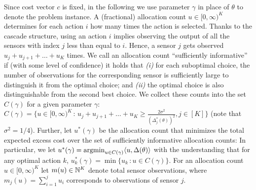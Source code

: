 Since cost vector $c$ is fixed, in the following we use parameter $\gamma$ in place of $\theta$ to denote the problem instance.
A (fractional) allocation count $u\in [0,\infty)^K$ determines for each action $i$ how many times the
action is selected.
Thanks to the cascade structure, using an action $i$ implies observing the output of all the sensors with index $j$ less than equal to $i$. Hence, a sensor $j$ gets observed $u_j+u_{j+1}+\dots+u_K$ times.
We call an allocation count ``sufficiently informative'' if (with some level of confidence)
it holds that {\em (i)} for each suboptimal choice, 
the number of observations for the corresponding sensor is sufficiently large to distinguish
it from the optimal choice; and  {\em (ii)}  the optimal choice is also distinguishable from the second best choice.
We collect these counts into the set $C(\gamma)$ for a given parameter $\gamma$:
$C(\gamma) = \{ u\in [0,\infty)^K\,:\, 
u_j+u_{j+1}+\dots+u_K
\ge \frac{2\sigma^2}{(\Delta_j^*(\theta))^2}, j\in [K] \}$
(note that $\sigma^2=1/4$).
Further, let $u^*(\gamma)$
be the allocation count that minimizes the total expected excess cost over the set of sufficiently informative allocation counts:
In particular,  we let $u^*(\gamma) = \operatorname{argmin}_{u\in C(\gamma)} \langle  u, \Delta(\theta)  \rangle$ 
with the understanding that for any optimal action $k$, $u_k^*(\gamma) = \min \{ u_k \,: u\in C(\gamma) \}$.
For an allocation count $u\in [0,\infty)^K$ let $m(u)\in \mathbb{N}^K$ denote total sensor observations, where $m_j(u) = \sum_{i=1}^j u_i$ corresponds to observations of sensor $j$.


